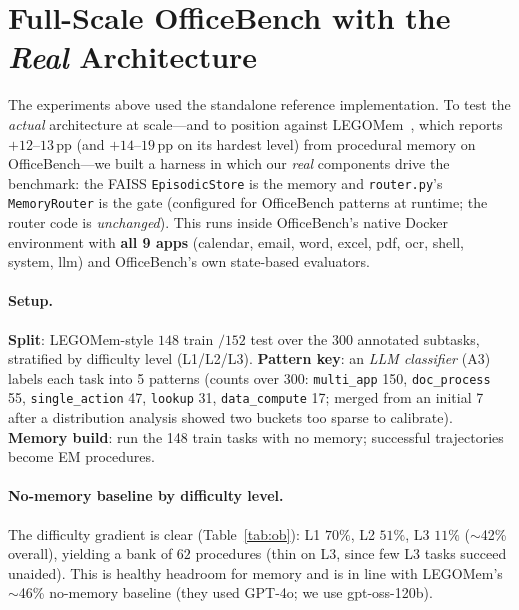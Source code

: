 \documentclass[10pt,twocolumn]{article}
\newcommand{\code}[1]{\texttt{\small #1}}
\begin{document}
\section{Full-Scale OfficeBench with the \emph{Real} Architecture}\label{sec:ob}
The experiments above used the standalone reference implementation. To test the
\emph{actual} architecture at scale---and to position against LEGOMem~\cite{legomem},
which reports $+12$--$13$\,pp (and $+14$--$19$\,pp on its hardest level) from
procedural memory on OfficeBench---we built a harness in which our \emph{real}
components drive the benchmark: the FAISS \code{EpisodicStore} is the memory and
\code{router.py}'s \code{MemoryRouter} is the gate (configured for OfficeBench
patterns at runtime; the router code is \emph{unchanged}). This runs inside
OfficeBench's native Docker environment with \textbf{all 9 apps} (calendar, email,
word, excel, pdf, ocr, shell, system, llm) and OfficeBench's own state-based
evaluators.

\paragraph{Setup.} \textbf{Split}: LEGOMem-style $148$ train $/152$ test over the
300 annotated subtasks, stratified by difficulty level (L1/L2/L3). \textbf{Pattern
key}: an \emph{LLM classifier} (A3) labels each task into 5 patterns (counts over
300: \code{multi\_app} 150, \code{doc\_process} 55, \code{single\_action} 47,
\code{lookup} 31, \code{data\_compute} 17; merged from an initial 7 after a
distribution analysis showed two buckets too sparse to calibrate). \textbf{Memory build}: run the 148 train tasks with no memory; successful trajectories
become EM procedures.

\paragraph{No-memory baseline by difficulty level.} The difficulty gradient
is clear (Table~\ref{tab:ob}): L1 $70\%$, L2 $51\%$, L3 $11\%$ ($\sim$42\% overall),
yielding a bank of $62$ procedures (thin on L3, since few L3 tasks succeed
unaided). This is healthy headroom for memory and is in line with LEGOMem's
$\sim$46\% no-memory baseline (they used GPT-4o; we use gpt-oss-120b).

\begin{table}[t]
\centering\small
{}
\caption{No-memory baseline on the 148 training tasks (the bank-building run),
by difficulty level. Overall $\sim$42\%; bank $=62$ procedures.}
\label{tab:ob}
\end{table}
\end{document}
